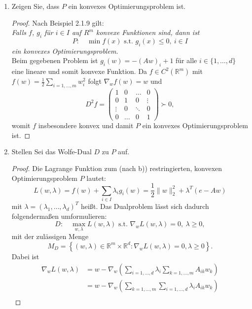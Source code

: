 \documentclass[12pt]{extreport} %
\newcommand{\R}{\mathbb{R}}
\theoremstyle{named}
\theoremstyle{nnamed}
\theoremstyle{itshape}
\theoremstyle{normal}
\begin{document}
\begin{enumerate}
\begin{proof}
			$$ f(x^\nu) = \frac{1}{2} \| x^\nu \|_2^2 \longrightarrow +\infty. $$
			Damit sind alle Voraussetzungen von Korollar 1.2.40 erfüllt, $S$ ist somit nicht-leer und kompakt und somit $P$ lösbar.
		\end{proof}
	\item Zeigen Sie, dass $P$ ein konvexes Optimierungsproblem ist.
		\begin{proof}
		Nach Beispiel 2.1.9 gilt: ~\\
			\textit{Falls $f$, $g_i$ für $i \in I$ auf $R^m$ konvexe Funktionen sind, dann ist}
			$$P: \quad \min f(x) \text{ s.t. } g_i (x) \leq 0, ~ i \in I $$
			\textit{ein konvexes Optimierungsproblem.} ~\\
			
			Beim gegebenen Problem ist $g_i(w) = - (A w)_i + 1$ für alle $i \in \{1, \dotsc, d \}$ eine lineare und somit konvexe Funktion. Da $f \in C^2(\R^m)$ mit $f(w) = \frac{1}{2} \sum_{i=1,\dotsc, m} w_i^2$ folgt $\nabla_w f(w) = w$ und 
			$$ D^2 f =  \left(\begin{array}{rrrrr} 1 & 0 & \dotsc & 0 \\ 0 & 1 & 0 & \vdots \\ \vdots & 0 & \ddots & 0\\ 0 &  \dotsc & 0 & 1 \end{array}\right) \succ 0, $$
			womit $f$ insbesondere konvex und damit $P$ ein konvexes Optimierungsproblem ist.
		\end{proof}
	\item Stellen Sei das Wolfe-Dual $D$ zu $P$ auf.
		\begin{proof}
			Die Lagrange Funktion zum (nach b)) restringierten, konvexen Optimierungsproblem $P$ lautet:
			$$ L(w, \lambda) = f(w) + \sum_{i \in I} \lambda_i g_i(w) = \frac{1}{2} \| w \|_2^2 + \lambda^T \left( e - Aw \right) $$
			mit $\lambda = \left( \lambda_1, \dotsc, \lambda_d \right)^T$ heißt. Das Dualproblem lässt sich dadurch folgendermaßen umformulieren:
			$$ D: \quad \max_{w,\lambda} L(w, \lambda) \text{ s.t. } \nabla_w L(w, \lambda) = 0, ~\lambda \geq 0, $$
			mit der zulässigen Menge
			$$ M_D = \left\{ (w, \lambda) \in \R^m \times \R^d \colon \nabla_w L(w, \lambda) = 0, \lambda \geq 0 \right\}. $$
			Dabei ist 
			\begin{align*}
			 \nabla_w L(w, \lambda) & = w - \nabla_w \left( \sum_{i=1,\dotsc,d} \lambda_i \sum_{k=1, \dotsc, m} A_{ik}w_{k} \right) \\
			& = w - \nabla_w \left( \sum_{k=1, \dotsc, m}  \sum_{i=1,\dotsc,d}  \lambda_i A_{ik}w_{k} \right) \\

\end{align*}
\end{proof}
\end{enumerate}
\end{document}
